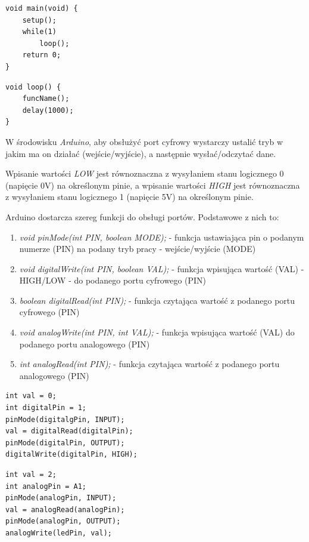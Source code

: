 \documentclass{xmgr}
\begin{document}
\begin{lstlisting}[label=bot-dirs-alg,caption=Odpowiednik wywołania pętli loop() w Arduino dla języka C/C++]
void main(void) {
	setup();
	while(1)
		loop();
	return 0;
}
\end{lstlisting}

\begin{lstlisting}[label=bot-dirs-alg,caption=Odpytywanie funkcji w nieskończonej pętli w środowisku Arduino]
void loop() {
	funcName();
	delay(1000);
}
\end{lstlisting}

W środowisku \emph{Arduino}, aby obsłużyć port cyfrowy wystarczy ustalić tryb w jakim ma on działać (wejście/wyjście), a następnie wysłać/odczytać dane.

Wpisanie wartości \emph{LOW} jest równoznaczna z wysyłaniem stanu logicznego 0 (napięcie 0V) na określonym pinie, a wpisanie wartości \emph{HIGH} jest równoznaczna z wysyłaniem stanu logicznego 1 (napięcie 5V) na określonym pinie.

Arduino dostarcza szereg funkcji do obsługi portów. Podstawowe z nich to:

\begin{enumerate}
	\item \emph{void pinMode(int PIN, boolean MODE);} - funkcja ustawiająca pin o podanym numerze (PIN) na podany tryb pracy - wejście/wyjście (MODE)
	\item \emph{void digitalWrite(int PIN, boolean VAL);} - funkcja wpisująca wartość (VAL) - HIGH/LOW - do podanego portu cyfrowego (PIN)
	\item \emph{boolean digitalRead(int PIN);} - funkcja czytająca wartość z podanego portu cyfrowego (PIN)
	\item \emph{void analogWrite(int PIN, int VAL);} - funkcja wpisująca wartość (VAL) do podanego portu analogowego (PIN)
	\item \emph{int analogRead(int PIN);}  - funkcja czytająca wartość z podanego portu analogowego (PIN)
\end{enumerate}

\begin{lstlisting}[label=bot-dirs-alg,caption=Obsługa portu cyfrowego w środowisku Arduino]
int val = 0;
int digitalPin = 1;	
pinMode(digitalgPin, INPUT);
val = digitalRead(digitalPin);
pinMode(digitalPin, OUTPUT);
digitalWrite(digitalPin, HIGH);
\end{lstlisting}

\begin{lstlisting}[label=bot-dirs-alg,caption=Obsługa portu analogowego w środowisku Arduino]
int val = 2;
int analogPin = A1;	
pinMode(analogPin, INPUT);
val = analogRead(analogPin);
pinMode(analogPin, OUTPUT);
analogWrite(ledPin, val);
\end{lstlisting}
\end{document}
